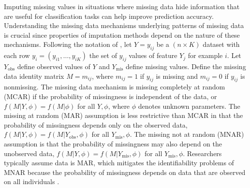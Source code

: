 \documentclass[10pt]{book}
\theoremstyle{definition}
\begin{document}
Imputing missing values in situations where missing data hide information that are useful for classification tasks can help improve prediction accuracy. Understanding the missing data mechanisms underlying patterns of missing data is crucial since properties of imputation methods depend on the nature of these mechanisms. Following the notation of \citet[Chap.~1]{little2014}, let $Y = y_{ij}$ be a $(n \times K)$ dataset with each row $y_i = (y_{i1}, \ldots, y_{iK})$ the set of $y_{ij}$ values of feature $Y_j$ for example $i$. Let $Y_{\mathrm{obs}}$ define observed values of $Y$ and $Y_{\mathrm{mis}}$ define missing values. Define the missing data identity matrix $M = m_{ij}$, where $m_{ij} = 1$ if $y_{ij}$ is missing and $m_{ij} = 0$ if $y_{ij}$ is nonmissing. The missing data mechanism is missing completely at random (MCAR) if the probability of missingness is independent of the data, or $f(M | Y, \phi) = f(M | \phi)$ for all $Y, \phi$, where $\phi$ denotes unknown parameters. The missing at random (MAR) assumption is less restrictive than MCAR in that the probability of missingness depends only on the observed data, $f(M | Y, \phi) = f(M | Y_{\mathrm{obs}}, \phi)$ for all $Y_{\mathrm{mis}}, \phi$. The missing not at random (MNAR) assumption is that the probability of missingness may also depend on the unobserved data, $f(M | Y, \phi) = f(M | Y_{\mathrm{mis}}, \phi)$ for all $Y_{\mathrm{mis}}, \phi$. Researchers typically assume data is MAR, which mitigates the identifiability problems of MNAR because the probability of missingness depends on data that are observed on all individuals \citep[Chap.~6]{tsiatis2007}. 

\par			
{} \label{section:techniques} 
\end{document}
